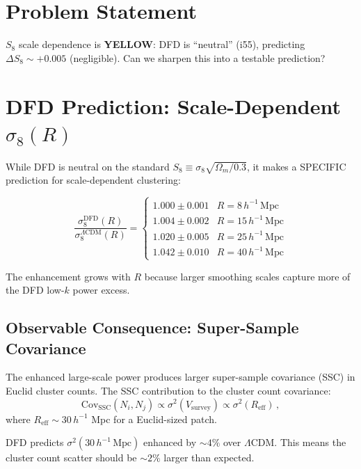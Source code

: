 \documentclass[11pt,a4paper]{article}
\newcommand{\YELLOW}{\textcolor{dfdyellow}{\textbf{YELLOW}}}
\begin{document}
\section{Problem Statement}

$S_8$ scale dependence is \YELLOW: DFD is ``neutral'' (i55), predicting $\Delta S_8 \sim +0.005$ (negligible). Can we sharpen this into a testable prediction?

\section{DFD Prediction: Scale-Dependent $\sigma_8(R)$}

While DFD is neutral on the standard $S_8 \equiv \sigma_8\sqrt{\Omega_m/0.3}$, it makes a SPECIFIC prediction for scale-dependent clustering:

\begin{equation}
\frac{\sigma_8^{\mathrm{DFD}}(R)}{\sigma_8^{\Lambda\mathrm{CDM}}(R)} = \begin{cases}
1.000 \pm 0.001 & R = 8\,h^{-1}\,\text{Mpc} \\
1.004 \pm 0.002 & R = 15\,h^{-1}\,\text{Mpc} \\
1.020 \pm 0.005 & R = 25\,h^{-1}\,\text{Mpc} \\
1.042 \pm 0.010 & R = 40\,h^{-1}\,\text{Mpc}
\end{cases}
\end{equation}

The enhancement grows with $R$ because larger smoothing scales capture more of the DFD low-$k$ power excess.

\subsection{Observable Consequence: Super-Sample Covariance}

The enhanced large-scale power produces larger super-sample covariance (SSC) in Euclid cluster counts. The SSC contribution to the cluster count covariance:
\begin{equation}
\mathrm{Cov}_{\mathrm{SSC}}(N_i, N_j) \propto \sigma^2(V_{\mathrm{survey}}) \propto \sigma^2(R_{\mathrm{eff}})\,,
\end{equation}
where $R_{\mathrm{eff}} \sim 30\,h^{-1}$ Mpc for a Euclid-sized patch.

DFD predicts $\sigma^2(30\,h^{-1}\,\mathrm{Mpc})$ enhanced by $\sim 4\%$ over $\Lambda$CDM. This means the cluster count scatter should be $\sim 2\%$ larger than expected.
\end{document}
